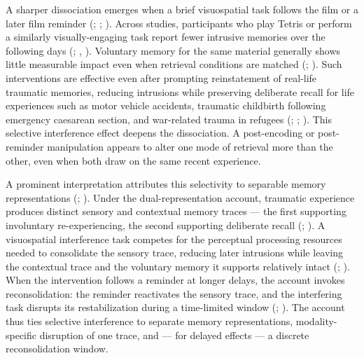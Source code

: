 \documentclass[
  man,
  floatsintext,
  longtable,
  nolmodern,
  notxfonts,
  notimes,
  draftfirst,
  colorlinks=true,linkcolor=blue,citecolor=blue,urlcolor=blue]{apa7}
\begin{document}
A sharper dissociation emerges when a brief visuospatial task follows
the film or a later film reminder (; ;
). Across
studies, participants who play Tetris or perform a similarly
visually-engaging task report fewer intrusive memories over the
following days (; ,
). Voluntary memory for the same
material generally shows little measurable impact even when retrieval
conditions are matched
(;
). Such
interventions are effective even after prompting reinstatement of
real-life traumatic memories, reducing intrusions while preserving
deliberate recall for life experiences such as motor vehicle accidents,
traumatic childbirth following emergency caesarean section, and
war-related trauma in refugees (; ; ). This
selective interference effect deepens the dissociation. A post-encoding
or post-reminder manipulation appears to alter one mode of retrieval
more than the other, even when both draw on the same recent experience.

A prominent interpretation attributes this selectivity to separable
memory representations (; ). Under the
dual-representation account, traumatic experience produces distinct
sensory and contextual memory traces --- the first supporting
involuntary re-experiencing, the second supporting deliberate recall
(;
). A visuospatial
interference task competes for the perceptual processing resources
needed to consolidate the sensory trace, reducing later intrusions while
leaving the contextual trace and the voluntary memory it supports
relatively intact (;
). When the
intervention follows a reminder at longer delays, the account invokes
reconsolidation: the reminder reactivates the sensory trace, and the
interfering task disrupts its restabilization during a time-limited
window (;
). The account thus
ties selective interference to separate memory representations,
modality-specific disruption of one trace, and --- for delayed effects
--- a discrete reconsolidation window.
\end{document}

